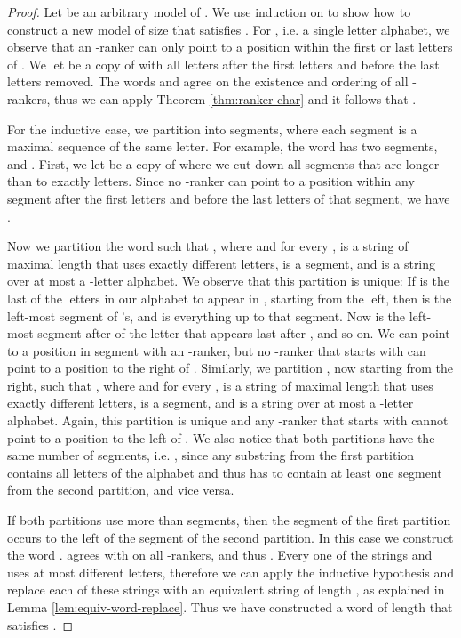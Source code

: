 \documentclass{LMCS}
\begin{document}
\begin{full}
\begin{proof}
  Let  be an arbitrary model of . We use induction on  to
  show how to construct a new model of size  that satisfies
  . For , i.e. a single letter alphabet, 
  we observe that an -ranker can only point to a
  position within the first or last  letters of . We let  be a
  copy of  with all letters after the first  letters and before the
  last  letters removed. The words  and  agree on the existence
  and ordering of all -rankers, thus we can apply Theorem
  \ref{thm:ranker-char} and it follows that .

  For the inductive case, we partition  into segments, where each segment
  is a maximal sequence of the same letter. For example, the word
   has two segments,  and .
  First, we let  be a copy of  where we cut down all segments that
  are longer than  to exactly  letters. Since no -ranker can
  point to a position within any segment after the first  letters and
  before the last  letters of that segment, we have .

  Now we partition the word  such that , where  and for every ,  is a
  string of maximal length that uses exactly  different letters,  is
  a segment, and  is a string over at most a -letter alphabet.
  We observe that this partition is unique: If  is the last
  of the  letters in our alphabet to appear in , starting from
  the left, then  is the left-most segment of 's, and 
  is everything up to that segment. Now  is the left-most segment after
   of the letter that appears last after , and so on. We can point
  to a position in segment  with an -ranker, but no -ranker that
  starts with  can point to a position to the right of .
  Similarly, we partition , now starting from the right, such that , where  and for every ,  is a string of maximal length that uses exactly 
  different letters,  is a segment, and  is a string over at
  most a -letter alphabet. Again, this partition is unique and any
  -ranker that starts with  cannot point to a position to the
  left of . We also notice that both partitions have the same number
  of segments, i.e. , since any substring  from the first
  partition contains all letters of the alphabet and thus has to contain
  at least one segment  from the second partition, and vice versa.

  If both partitions use more than  segments, then the segment
   of the first partition occurs to the left of the segment  of
  the second partition. In this case we construct the word .  agrees with  on
  all -rankers, and thus . Every one of the strings
   and  uses at most  different
  letters, therefore we can apply the inductive hypothesis and replace each
  of these strings with an equivalent string of length , as
  explained in Lemma \ref{lem:equiv-word-replace}. Thus we
  have constructed a word of length  that satisfies .


\end{proof}
\end{full}
\end{document}

